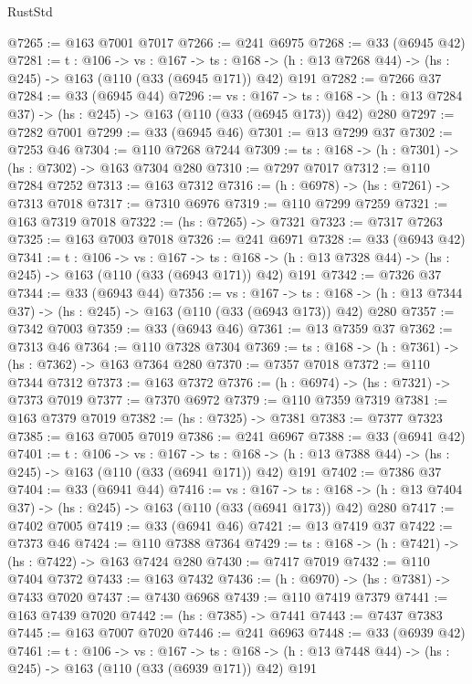\begin{lexlean}{RustStd}
\begin{coremodule}
@7265 := @163 @7001 @7017
@7266 := @241 @6975
@7268 := @33 (@6945 @42)
@7281 := {t : @106} ->
  {vs : @167} ->
  {ts : @168} -> (h : @13 @7268 @44) -> (hs : @245) -> @163 (@110 (@33 (@6945 @171)) @42) @191
@7282 := @7266 @37
@7284 := @33 (@6945 @44)
@7296 := {vs : @167} ->
  {ts : @168} -> (h : @13 @7284 @37) -> (hs : @245) -> @163 (@110 (@33 (@6945 @173)) @42) @280
@7297 := @7282 @7001
@7299 := @33 (@6945 @46)
@7301 := @13 @7299 @37
@7302 := @7253 @46
@7304 := @110 @7268 @7244
@7309 := {ts : @168} -> (h : @7301) -> (hs : @7302) -> @163 @7304 @280
@7310 := @7297 @7017
@7312 := @110 @7284 @7252
@7313 := @163 @7312
@7316 := (h : @6978) -> (hs : @7261) -> @7313 @7018
@7317 := @7310 @6976
@7319 := @110 @7299 @7259
@7321 := @163 @7319 @7018
@7322 := (hs : @7265) -> @7321
@7323 := @7317 @7263
@7325 := @163 @7003 @7018
@7326 := @241 @6971
@7328 := @33 (@6943 @42)
@7341 := {t : @106} ->
  {vs : @167} ->
  {ts : @168} -> (h : @13 @7328 @44) -> (hs : @245) -> @163 (@110 (@33 (@6943 @171)) @42) @191
@7342 := @7326 @37
@7344 := @33 (@6943 @44)
@7356 := {vs : @167} ->
  {ts : @168} -> (h : @13 @7344 @37) -> (hs : @245) -> @163 (@110 (@33 (@6943 @173)) @42) @280
@7357 := @7342 @7003
@7359 := @33 (@6943 @46)
@7361 := @13 @7359 @37
@7362 := @7313 @46
@7364 := @110 @7328 @7304
@7369 := {ts : @168} -> (h : @7361) -> (hs : @7362) -> @163 @7364 @280
@7370 := @7357 @7018
@7372 := @110 @7344 @7312
@7373 := @163 @7372
@7376 := (h : @6974) -> (hs : @7321) -> @7373 @7019
@7377 := @7370 @6972
@7379 := @110 @7359 @7319
@7381 := @163 @7379 @7019
@7382 := (hs : @7325) -> @7381
@7383 := @7377 @7323
@7385 := @163 @7005 @7019
@7386 := @241 @6967
@7388 := @33 (@6941 @42)
@7401 := {t : @106} ->
  {vs : @167} ->
  {ts : @168} -> (h : @13 @7388 @44) -> (hs : @245) -> @163 (@110 (@33 (@6941 @171)) @42) @191
@7402 := @7386 @37
@7404 := @33 (@6941 @44)
@7416 := {vs : @167} ->
  {ts : @168} -> (h : @13 @7404 @37) -> (hs : @245) -> @163 (@110 (@33 (@6941 @173)) @42) @280
@7417 := @7402 @7005
@7419 := @33 (@6941 @46)
@7421 := @13 @7419 @37
@7422 := @7373 @46
@7424 := @110 @7388 @7364
@7429 := {ts : @168} -> (h : @7421) -> (hs : @7422) -> @163 @7424 @280
@7430 := @7417 @7019
@7432 := @110 @7404 @7372
@7433 := @163 @7432
@7436 := (h : @6970) -> (hs : @7381) -> @7433 @7020
@7437 := @7430 @6968
@7439 := @110 @7419 @7379
@7441 := @163 @7439 @7020
@7442 := (hs : @7385) -> @7441
@7443 := @7437 @7383
@7445 := @163 @7007 @7020
@7446 := @241 @6963
@7448 := @33 (@6939 @42)
@7461 := {t : @106} ->
  {vs : @167} ->
  {ts : @168} -> (h : @13 @7448 @44) -> (hs : @245) -> @163 (@110 (@33 (@6939 @171)) @42) @191

\end{coremodule}
\end{lexlean}
